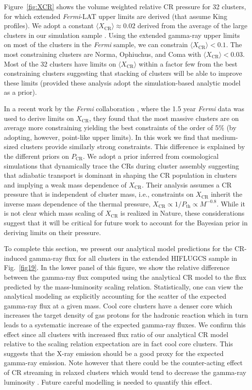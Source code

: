 \documentclass[10pt,aps,pra,reprint,amsmath,amsfonts,amssymb,showpacs,nofootinbib,floatfix]{revtex4-1}
\newcommand{\Fermi}{{\em Fermi}\xspace}
\newcommand{\rmn}{\mathrm}
\newcommand{\bra}{\langle}
\newcommand{\ket}{\rangle}
\newcommand{\CR}{\rmn{CR}}
\begin{document}
{Figure~\ref{fig:XCR} shows the volume weighted relative CR pressure
for 32 clusters, for which extended \Fermi-LAT upper limits are
derived (that assume King profiles). We adopt a constant $\bra
X_\CR\ket\approx 0.02$ derived from the average of the large clusters
in our simulation sample \cite{2008MNRAS.385.1211P,
  2010MNRAS.409..449P}. Using the extended gamma-ray upper limits on
most of the clusters in the \Fermi sample, we can constrain $\bra
X_\CR \ket< 0.1$. The most constraining clusters are Norma, Ophiuchus,
and Coma with $\bra X_\CR\ket < 0.03$. Most of the 32 clusters have
limits on $\bra X_\CR\ket$ within a factor few from the best
constraining clusters suggesting that stacking of clusters will be
able to improve these limits (provided these analysis adopt the
simulation-based analytic model \cite{2010MNRAS.409..449P} as a
prior).

In a recent work by the \Fermi collaboration
\cite{2010ApJ...717L..71A}, where the 1.5 year \Fermi data was used to
derive limits on $X_\CR$, they found that the most massive clusters
are on average more constraining yielding the best constraints of the
order of 5\% (by adopting, however, point-like upper limits). In this
work we find that medium-sized clusters provide similarly strong
constraints. This difference is explained by the different priors on
$P_\CR$. We adopt a prior inferred from cosmological simulations that
dynamically trace the CRs during cluster assembly suggesting that
adiabatic transport is dominant in shaping the CR population in
clusters and implying a weak mass dependence of $X_\CR$. Their
analysis assumes a CR pressure that is independent of cluster mass,
i.e., constraints on $X_\CR$ inherit the inverse mass dependence of
the thermal pressure, $X_\CR\propto 1/P_\rmn{th}\propto
M^{-0.8}$. While it is not clear which mass scaling of $X_\CR$ is
realized in Nature, these considerations suggest that it will be
critical for future work to account for the Bayesian prior in deriving
limits on their pressure.

To complete this section, we present our analytical model predictions
for the CR-induced gamma-ray flux for all clusters in the extended
HIFLUGCS sample in Fig.~\ref{fig19}. In the lower panel of this
figure, we show the relative difference between the gamma-ray flux
computed using the analytical CR model to the flux predicted by the
mass-luminosity scaling relation. Statistically, one can view the
analytical modeling as explicitly accounting for the scatter of the expected
gamma-ray flux at a given mass. Cool core clusters have a denser core
which increases the target density of gas protons for the hadronic
reaction which in turn leads to a systematic increase of the expected
gamma-ray fluxes. We confirm this effect since all clusters with
increased flux ratio of our analytical CR model relative to the scaling relation
expectation are in fact cool core clusters. This suggests that the X-ray
emission should be a good proxy for the expected gamma-ray
emission. Note however that there could be the counter-acting effect
of CR streaming in relaxed clusters which would tend to decrease the
gamma-ray luminosity \cite{2011A&A...527A..99E}. Future careful
modelling is needed to quantify this effect.


}
\end{document}
